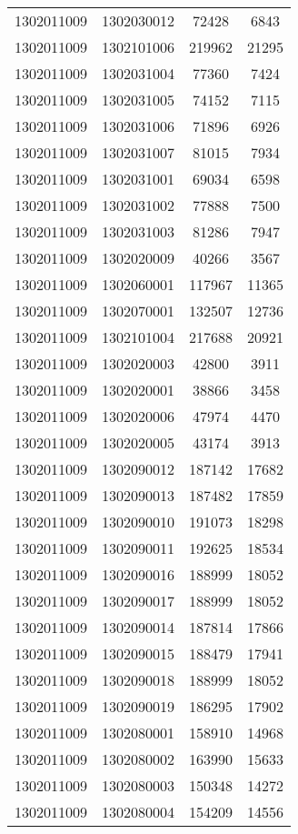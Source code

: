 \begin{longtable}[h]{llcc}
		1302011009 & 1302030012 & 72428 & 6843\\
		1302011009 & 1302101006 & 219962 & 21295\\
		1302011009 & 1302031004 & 77360 & 7424\\
		1302011009 & 1302031005 & 74152 & 7115\\
		1302011009 & 1302031006 & 71896 & 6926\\
		1302011009 & 1302031007 & 81015 & 7934\\
		1302011009 & 1302031001 & 69034 & 6598\\
		1302011009 & 1302031002 & 77888 & 7500\\
		1302011009 & 1302031003 & 81286 & 7947\\
		1302011009 & 1302020009 & 40266 & 3567\\
		1302011009 & 1302060001 & 117967 & 11365\\
		1302011009 & 1302070001 & 132507 & 12736\\
		1302011009 & 1302101004 & 217688 & 20921\\
		1302011009 & 1302020003 & 42800 & 3911\\
		1302011009 & 1302020001 & 38866 & 3458\\
		1302011009 & 1302020006 & 47974 & 4470\\
		1302011009 & 1302020005 & 43174 & 3913\\
		1302011009 & 1302090012 & 187142 & 17682\\
		1302011009 & 1302090013 & 187482 & 17859\\
		1302011009 & 1302090010 & 191073 & 18298\\
		1302011009 & 1302090011 & 192625 & 18534\\
		1302011009 & 1302090016 & 188999 & 18052\\
		1302011009 & 1302090017 & 188999 & 18052\\
		1302011009 & 1302090014 & 187814 & 17866\\
		1302011009 & 1302090015 & 188479 & 17941\\
		1302011009 & 1302090018 & 188999 & 18052\\
		1302011009 & 1302090019 & 186295 & 17902\\
		1302011009 & 1302080001 & 158910 & 14968\\
		1302011009 & 1302080002 & 163990 & 15633\\
		1302011009 & 1302080003 & 150348 & 14272\\
		1302011009 & 1302080004 & 154209 & 14556\\

\end{longtable}
